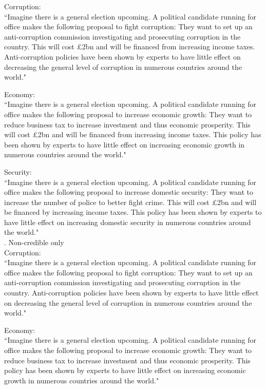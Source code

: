 \documentclass[11pt]{article}
\begin{document}
Corruption:\\
“Imagine there is a general election upcoming. A political candidate running for office makes the following proposal to fight corruption: They want to set up an anti-corruption commission investigating and prosecuting corruption in the country. This will cost £2bn and will be financed from increasing income taxes. Anti-corruption policies have been shown by experts to have little effect on decreasing the general level of corruption in numerous countries around the world."

Economy:\\
“Imagine there is a general election upcoming. A political candidate running for office makes the following proposal to increase economic growth: They want to reduce business tax to increase investment and thus economic prosperity. This will cost £2bn and will be financed from increasing income taxes. This policy has been shown by experts to have little effect on increasing economic growth in numerous countries around the world."

Security:\\
“Imagine there is a general election upcoming. A political candidate running for office makes the following proposal to increase domestic security: They want to increase the number of police to better fight crime. This will cost £2bn and will be financed by increasing income taxes. This policy has been shown by experts to have little effect on increasing domestic security in numerous countries around the world."\\

. Non-credible only\\

Corruption:\\
“Imagine there is a general election upcoming. A political candidate running for office makes the following proposal to fight corruption: They want to set up an anti-corruption commission investigating and prosecuting corruption in the country. Anti-corruption policies have been shown by experts to have little effect on decreasing the general level of corruption in numerous countries around the world."

Economy:\\
“Imagine there is a general election upcoming. A political candidate running for office makes the following proposal to increase economic growth: They want to reduce business tax to increase investment and thus economic prosperity. This policy has been shown by experts to have little effect on increasing economic growth in numerous countries around the world."
\end{document}
